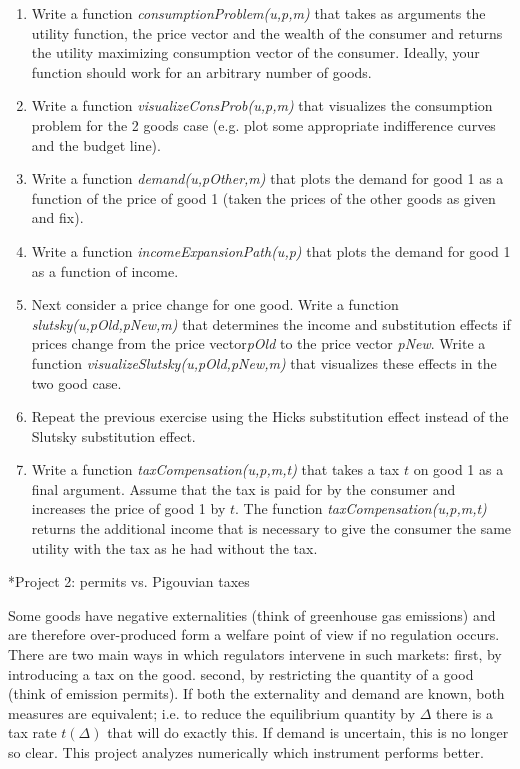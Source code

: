 \documentclass[a4paper,12pt]{article}
\makeatletter
\renewcommand{\section}{\@startsection{section}{1}{0mm}{-1.5\baselineskip}{0.8\baselineskip}{\normalfont\large\centering}}
\renewcommand{\section}{\@startsection{section}{1}{0mm}{-0.9\baselineskip}{0.5\baselineskip}{\normalfont\large\centering}}
\makeatother
\begin{document}
\begin{enumerate}
\item Write a function \emph{consumptionProblem(u,p,m)} that takes as arguments the utility function, the price vector and the wealth of the consumer and returns the utility maximizing consumption vector of the consumer. Ideally, your function should work for an arbitrary number of goods.
\item Write a function \emph{visualizeConsProb(u,p,m)} that visualizes the consumption problem for the 2 goods case (e.g. plot some appropriate indifference curves and the budget line).
\item Write a function \emph{demand(u,pOther,m)} that plots the demand for good 1 as a function of the price of good 1 (taken the prices of the other goods as given and fix).   
\item Write a function \emph{incomeExpansionPath(u,p)} that plots the demand for good 1 as a function of income. 
\item Next consider a price change for one good. Write a function \emph{slutsky(u,pOld,pNew,m)} that determines the income and substitution effects if prices change from the price vector\emph{pOld} to the price vector \emph{pNew}. Write a function \emph{visualizeSlutsky(u,pOld,pNew,m)} that visualizes these effects in the two good case.
\item Repeat the previous exercise using the Hicks substitution effect instead of the Slutsky substitution effect. 
\item Write a function \emph{taxCompensation(u,p,m,t)} that takes a tax $t$ on good 1 as a final argument. Assume that the tax is paid for by the consumer and increases the price of good 1 by $t$. The function \emph{taxCompensation(u,p,m,t)} returns the additional income that is necessary to give the consumer the same utility with the tax as he had without the tax.
  
\end{enumerate}


\section*{Project 2: permits vs. Pigouvian taxes }
\label{sec:project-2:-permits}

Some goods have negative externalities (think of greenhouse gas emissions) and are therefore over-produced form a welfare point of view if no regulation occurs. There are two main ways in which regulators intervene in such markets: first, by introducing a tax on the good. second, by restricting the quantity of a good (think of emission permits). If both the externality and demand are known, both measures are equivalent; i.e. to reduce the equilibrium quantity by $\Delta$ there is a tax rate $t(\Delta)$ that will do exactly this. If demand is uncertain, this is no longer so clear. This project analyzes numerically which instrument performs better.
\end{document}
